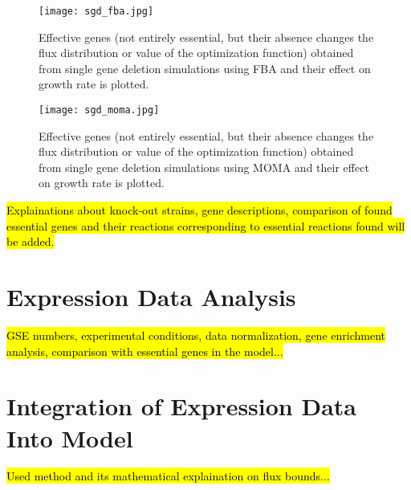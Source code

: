 \begin{figure}[H]
\begin{center}
\texttt{[image: sgd\_fba.jpg]}
\end{center}
\caption[Effective genes found from the deletion analysis using FBA]{Effective genes (not entirely essential, but  their absence changes the flux distribution or value of the optimization function) obtained from single gene deletion simulations using FBA and their effect on growth rate is plotted.}
\label{fig:sgd_fba}
\end{figure}

\begin{figure}[H]
\begin{center}
\texttt{[image: sgd\_moma.jpg]}
\end{center}
\caption[Effective genes found from the deletion analysis using MOMA]{Effective genes (not entirely essential, but their absence changes the flux distribution or value of the optimization function) obtained from single gene deletion simulations using MOMA and their effect on growth rate is plotted.}
\label{fig:sgd_moma}
\end{figure}
\hl{Explainations about knock-out strains, gene descriptions, comparison of found essential genes and their reactions corresponding to essential reactions found will be added.}



\section{Expression Data Analysis}
\hl{GSE numbers, experimental conditions, data normalization, gene enrichment analysis, comparison with essential genes in the model...}
\section{Integration of Expression Data Into Model}
\hl{Used method and its mathematical explaination on flux bounds...}
